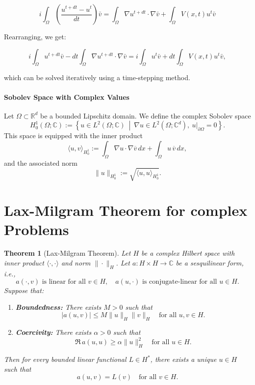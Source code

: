 \documentclass{article}
\theoremstyle{definition}
\theoremstyle{plain}
\newtheorem{theorem}[definition]{Theorem}
\theoremstyle{remark}
\begin{document}
\begin{equation}
    i \int_{\Omega} \left( \frac{u^{t + dt} - u^t}{dt} \right) \bar{v} = \int_{\Omega} \nabla u^{t + dt} \cdot \nabla \bar{v} + \int_{\Omega} V(x,t) u^t \bar{v}
\end{equation}

Rearranging, we get:

\begin{equation}
    i \int_{\Omega} u^{t + dt} \bar{v} - dt \int_{\Omega} \nabla u^{t + dt} \cdot \nabla \bar{v} = i \int_{\Omega} u^t \bar{v} + dt \int_{\Omega} V(x,t) u^t \bar{v},
\end{equation}

which can be solved iteratively using a time-stepping method.

\paragraph{Sobolev Space with Complex Values}
Let $\Omega \subset \mathbb{R}^d$ be a bounded Lipschitz domain. We define the complex Sobolev space
\[
H_0^1(\Omega; \mathbb{C}) := \left\{ u \in L^2(\Omega; \mathbb{C}) \ \middle| \ \nabla u \in L^2(\Omega; \mathbb{C}^d), \ u|_{\partial \Omega} = 0 \right\}.
\]
This space is equipped with the inner product
\[
\langle u, v \rangle_{H_0^1} := \int_\Omega \nabla u \cdot \nabla \overline{v} \, dx + \int_\Omega u \, \overline{v} \, dx,
\]
and the associated norm
\[
\|u\|_{H_0^1} := \sqrt{ \langle u, u \rangle_{H_0^1} }.
\]


\section{Lax-Milgram Theorem for complex Problems}
\begin{theorem}
[Lax-Milgram Theorem]
Let $H$ be a complex Hilbert space with inner product $\langle \cdot, \cdot \rangle$ and norm $\| \cdot \|_H$. Let $a : H \times H \to \mathbb{C}$ be a sesquilinear form, i.e.,
\[
a(\cdot, v) \text{ is linear for all } v \in H, \quad a(u, \cdot) \text{ is conjugate-linear for all } u \in H.
\]
Suppose that:
\begin{enumerate}
    \item \textbf{Boundedness:} There exists $M > 0$ such that
    \[
    |a(u, v)| \leq M \|u\|_H \|v\|_H \quad \text{for all } u, v \in H.
    \]
    \item \textbf{Coercivity:} There exists $\alpha > 0$ such that
    \[
    \Re \, a(u, u) \geq \alpha \|u\|_H^2 \quad \text{for all } u \in H.
    \]
\end{enumerate}
Then for every bounded linear functional $L \in H^*$, there exists a unique $u \in H$ such that
\[
a(u, v) = L(v) \quad \text{for all } v \in H.
\]
\end{theorem}
\end{document}
